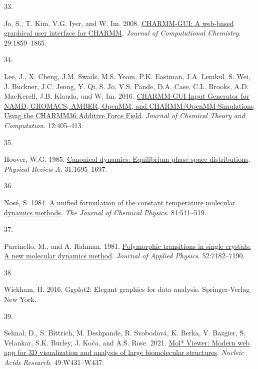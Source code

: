 \documentclass[
  letterpaper,
  DIV=11,
  numbers=noendperiod]{scrartcl}
\newlength{\cslhangindent}
\newlength{\csllabelwidth}
\newlength{\cslentryspacingunit} %
\newenvironment{CSLReferences}[2] %
 {%
  \setlength{\parindent}{0pt}
  \ifodd #1
  \let\oldpar\par
  \def\par{\hangindent=\cslhangindent\oldpar}
  \fi
  \setlength{\parskip}{#2\cslentryspacingunit}
 }%
 {}
\newcommand{\CSLLeftMargin}[1]{\parbox[t]{\csllabelwidth}{#1}}
\newcommand{\CSLRightInline}[1]{\parbox[t]{\linewidth - \csllabelwidth}{#1}\break}
\begin{document}
\begin{CSLReferences}{0}{0}
\leavevmode{}%
\CSLLeftMargin{33. }
\CSLRightInline{Jo, S., T. Kim, V.G. Iyer, and W. Im. 2008.
\href{https://doi.org/10.1002/jcc.20945}{{CHARMM-GUI}: A web-based
graphical user interface for {CHARMM}}. \emph{Journal of Computational
Chemistry}. 29:1859--1865.}

\leavevmode{}%
\CSLLeftMargin{34. }
\CSLRightInline{Lee, J., X. Cheng, J.M. Swails, M.S. Yeom, P.K. Eastman,
J.A. Lemkul, S. Wei, J. Buckner, J.C. Jeong, Y. Qi, S. Jo, V.S. Pande,
D.A. Case, C.L. Brooks, A.D. MacKerell, J.B. Klauda, and W. Im. 2016.
\href{https://doi.org/10.1021/acs.jctc.5b00935}{{CHARMM-GUI Input
Generator} for {NAMD}, {GROMACS}, {AMBER}, {OpenMM}, and
{CHARMM}/{OpenMM Simulations Using} the {CHARMM36 Additive Force
Field}}. \emph{Journal of Chemical Theory and Computation}.
12:405--413.}

\leavevmode{}%
\CSLLeftMargin{35. }
\CSLRightInline{Hoover, W.G. 1985.
\href{https://doi.org/10.1103/PhysRevA.31.1695}{Canonical dynamics:
{Equilibrium} phase-space distributions}. \emph{Physical Review A}.
31:1695--1697.}

\leavevmode{}%
\CSLLeftMargin{36. }
\CSLRightInline{Nosé, S. 1984. \href{https://doi.org/10.1063/1.447334}{A
unified formulation of the constant temperature molecular dynamics
methods}. \emph{The Journal of Chemical Physics}. 81:511--519.}

\leavevmode{}%
\CSLLeftMargin{37. }
\CSLRightInline{Parrinello, M., and A. Rahman. 1981.
\href{https://doi.org/10.1063/1.328693}{Polymorphic transitions in
single crystals: {A} new molecular dynamics method}. \emph{Journal of
Applied Physics}. 52:7182--7190.}

\leavevmode{}%
\CSLLeftMargin{38. }
\CSLRightInline{Wickham, H. 2016. Ggplot2: {Elegant} graphics for data
analysis. {Springer-Verlag New York}.}

\leavevmode{}%
\CSLLeftMargin{39. }
\CSLRightInline{Sehnal, D., S. Bittrich, M. Deshpande, R. Svobodová, K.
Berka, V. Bazgier, S. Velankar, S.K. Burley, J. Koča, and A.S. Rose.
2021. \href{https://doi.org/10.1093/nar/gkab314}{Mol* {Viewer}: Modern
web app for {3D} visualization and analysis of large biomolecular
structures}. \emph{Nucleic Acids Research}. 49:W431--W437.}


\end{CSLReferences}
\end{document}
